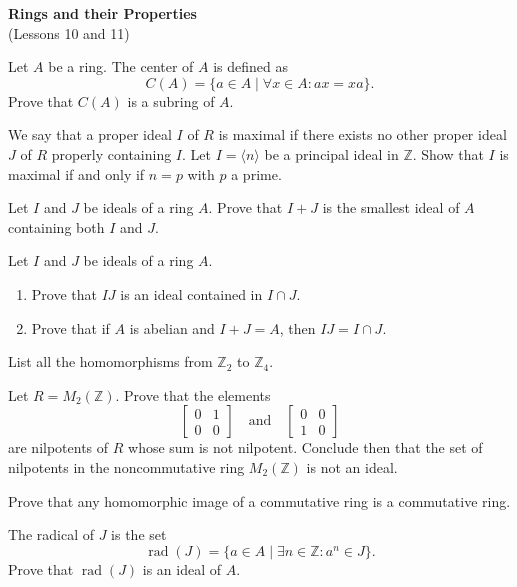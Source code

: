\documentclass[
    11pt,a4paper,
]{exam}
\begin{document}
\def\contador{Problem Set 5}


\begin{center}
    {\bfseries\Large
        Rings and their Properties}\\
    (Lessons 10 and  11)
\end{center}

\begin{questions}
\question
Let $A$ be a ring. The center of $A$ is defined as
\[
C(A) = \{a \in A \mid \forall x \in A : ax = xa\}.
\]
Prove that $C(A)$ is a subring of $A$.

\question
We say that a proper ideal $I$ of $R$ is maximal if there exists no other proper ideal $J$ of $R$ properly containing $I$. Let $I = \langle n \rangle$ be a principal ideal in $\mathbb{Z}$. Show that $I$ is maximal if and only if $n = p$ with $p$ a prime.

\question
Let $I$ and $J$ be ideals of a ring $A$. Prove that $I + J$ is the smallest ideal of $A$ containing both $I$ and $J$.

\question
Let $I$ and $J$ be ideals of a ring $A$.
\begin{enumerate}[label=(\roman*)]
    \item Prove that $IJ$ is an ideal contained in $I \cap J$.
    \item Prove that if $A$ is abelian and $I + J = A$, then $IJ = I \cap J$.
\end{enumerate}

\question
List all the homomorphisms from $\mathbb{Z}_2$ to $\mathbb{Z}_4$.

\question
Let $R = M_2(\mathbb{Z})$. Prove that the elements 
\[
\begin{bmatrix} 0 & 1 \\ 0 & 0 \end{bmatrix} \quad \text{and} \quad \begin{bmatrix} 0 & 0 \\ 1 & 0 \end{bmatrix}
\]
are nilpotents of $R$ whose sum is not nilpotent. Conclude then that the set of nilpotents in the noncommutative ring $M_2(\mathbb{Z})$ is not an ideal.

\question
Prove that any homomorphic image of a commutative ring is a commutative ring.

\question
The radical of $J$ is the set
\[
\operatorname{rad}(J) = \{a \in A \mid \exists n \in \mathbb{Z} : a^n \in J\}.
\]
Prove that $\operatorname{rad}(J)$ is an ideal of $A$.


\end{questions}
\end{document}
